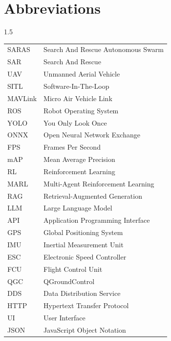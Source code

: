 \chapter*{Abbreviations}
\begin{spacing}{1.5}
\indent
\begin{tabular}{ll}
SARAS & Search And Rescue Autonomous Swarm \\
SAR & Search And Rescue \\
UAV & Unmanned Aerial Vehicle \\
SITL & Software-In-The-Loop \\
MAVLink & Micro Air Vehicle Link \\
ROS & Robot Operating System \\
YOLO & You Only Look Once \\
ONNX & Open Neural Network Exchange \\
FPS & Frames Per Second \\
mAP & Mean Average Precision \\
RL & Reinforcement Learning \\
MARL & Multi-Agent Reinforcement Learning \\
RAG & Retrieval-Augmented Generation \\
LLM & Large Language Model \\
API & Application Programming Interface \\
GPS & Global Positioning System \\
IMU & Inertial Measurement Unit \\
ESC & Electronic Speed Controller \\
FCU & Flight Control Unit \\
QGC & QGroundControl \\
DDS & Data Distribution Service \\
HTTP & Hypertext Transfer Protocol \\
UI & User Interface \\
JSON & JavaScript Object Notation \\
\end{tabular}   
\end{spacing}
